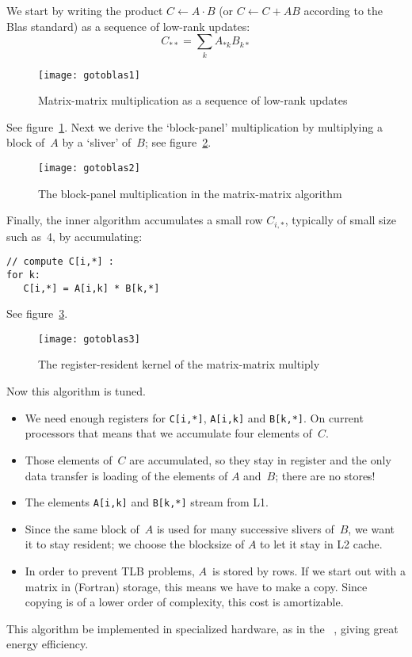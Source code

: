 We start by writing the product $C\leftarrow A\cdot B$ (or
  $C\leftarrow C+AB$ according to the Blas standard) as a sequence of
  low-rank updates:
\[ C_{**} = \sum_k  A_{*k}B_{k*} \]
\begin{figure}[ht]
\texttt{[image: gotoblas1]}
\caption{Matrix-matrix multiplication as a sequence of low-rank updates}
\label{fig:goto1}
\end{figure}
See figure~\ref{fig:goto1}. Next we derive the `block-panel' multiplication
by multiplying a block of~$A$ by a `sliver' of~$B$; see figure~\ref{fig:goto2}.
\begin{figure}[ht]
\texttt{[image: gotoblas2]}  
\caption{The block-panel multiplication in the matrix-matrix algorithm}
\label{fig:goto2}
\end{figure}
Finally, the inner algorithm accumulates a small row $C_{i,*}$,
typically of small size such as~4, by accumulating:
\begin{verbatim}
// compute C[i,*] :
for k:
   C[i,*] = A[i,k] * B[k,*]
\end{verbatim}
See figure~\ref{fig:goto3}.
\begin{figure}[ht]
\texttt{[image: gotoblas3]}
\caption{The register-resident kernel of the matrix-matrix multiply}
\label{fig:goto3}
\end{figure}
Now this algorithm is tuned.
\begin{itemize}
\item We need enough registers for \verb+C[i,*]+, \verb+A[i,k]+ and
  \verb+B[k,*]+. On current processors that means that we accumulate
  four elements of~$C$.
\item Those elements of~$C$ are accumulated, so they stay in register
  and the only data transfer is loading of the elements of $A$
  and~$B$; there are no stores!
\item The elements \verb+A[i,k]+ and \verb+B[k,*]+ stream from L1.
\item Since the same block of~$A$ is used for many successive slivers
  of~$B$, we want it to stay resident; we choose the blocksize of $A$
  to let it stay in L2 cache.
\item In order to prevent TLB problems, $A$~is stored by rows. If we
  start out with a matrix in (Fortran) 
  storage, this means we have to make a copy. Since copying is of a
  lower order of complexity, this cost is amortizable.
\end{itemize}

This algorithm be implemented in specialized hardware, as in the
~\cite{GoogleTPUpage}, giving great energy efficiency.

